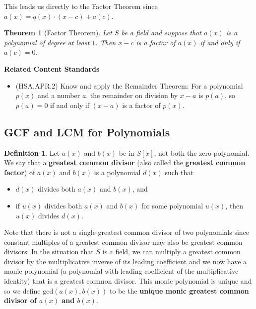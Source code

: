 \documentclass[
]{book}
\providecommand{\tightlist}{%
  \setlength{\itemsep}{0pt}\setlength{\parskip}{0pt}}
\newenvironment{standards}{}{}
\newtheorem{theorem}{Theorem}[chapter]
\theoremstyle{definition}
\newtheorem{definition}{Definition}[chapter]
\theoremstyle{definition}
\theoremstyle{definition}
\theoremstyle{definition}
\theoremstyle{remark}
\begin{document}
This leads us directly to the Factor Theorem since \(a(x)=q(x)\cdot (x-c) + a(c)\).

\begin{theorem}[Factor Theorem]
Let \(S\) be a field and suppose that \(a(x)\) is a polynomial of degree at least \(1\). Then \(x-c\) is a factor of \(a(x)\) if and only if \(a(c)=0\).
\end{theorem}

\begin{standards}

\begin{center}
\textbf{Related Content Standards}

\end{center}

\begin{itemize}
\tightlist
\item
  (HSA.APR.2) Know and apply the Remainder Theorem: For a polynomial \(p(x)\) and a number \(a\), the remainder on division by \(x-a\) is \(p(a)\), so \(p(a)=0\) if and only if \((x-a)\) is a factor of \(p(x)\).\\
\end{itemize}

\end{standards}

\hypertarget{gcf-and-lcm-for-polynomials}{%
\subsection{GCF and LCM for Polynomials}\label{gcf-and-lcm-for-polynomials}}

\begin{definition}

Let \(a(x)\) and \(b(x)\) be in \(S[x]\), not both the zero polynomial. We say that a \textbf{greatest common divisor} (also called the \textbf{greatest common factor}) of \(a(x)\) and \(b(x)\) is a polynomial \(d(x)\) such that

\begin{itemize}
\tightlist
\item
  \(d(x)\) divides both \(a(x)\) and \(b(x)\), and
\item
  if \(u(x)\) divides both \(a(x)\) and \(b(x)\) for some polynomial \(u(x)\), then \(u(x)\) divides \(d(x)\).
\end{itemize}

\end{definition}

Note that there is not a single greatest common divisor of two polynomials since constant multiples of a greatest common divisor may also be greatest common divisors. In the situation that \(S\) is a field, we can multiply a greatest common divisor by the multiplicative inverse of its leading coefficient and we now have a monic polynomial (a polynomial with leading coefficient of the multiplicative identity) that is a greatest common divisor. This monic polynomial is unique and so we define \(\mathrm{gcd}(a(x),b(x))\) to be the \textbf{unique monic greatest common divisor of \(a(x)\) and \(b(x)\)}.
\end{document}
